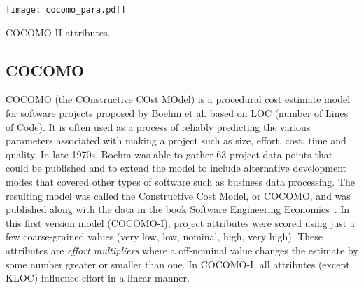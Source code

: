


\begin{table}
\centerline{\texttt{[image: cocomo\_para.pdf]}}
\caption{COCOMO-II attributes.}
\label{tbl:cparems}
\vspace{-0.6cm}
\end{table}



\subsection{COCOMO}
\label{sec:coco}

COCOMO (the COnstructive COst MOdel) is a procedural cost estimate model for software projects proposed by Boehm et al. based on LOC (number of Lines of Code). It is often used as a process of reliably predicting the various parameters associated with making a project such as size, effort, cost, time and quality. In late 1970s, Boehm was able to gather 63 project data points that could be published and to extend the model to
include alternative development modes that covered
other types of software such as business data
processing.  The resulting model was called the
Constructive Cost Model, or COCOMO, and was
published along with the data in the book Software
Engineering Economics~\cite{boehm1981software}. 
In this first version model (COCOMO-I), project attributes
were scored using just a few coarse-grained values (very low,
low, nominal, high, very high). These attributes
are {\em effort multipliers} where
a off-nominal value changes the estimate by some number
greater or smaller than one.
In COCOMO-I, all attributes (except KLOC)
influence effort in a linear manner.



